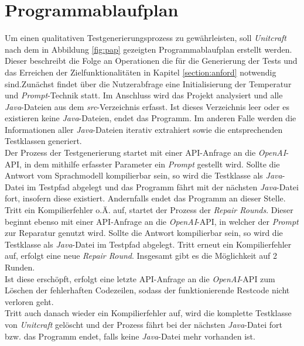 \section{Programmablaufplan}
Um einen qualitativen Testgenerierungsprozess zu gewährleisten, soll \textit{Unitcraft} nach dem in Abbildung \ref{fig:pap} gezeigten Programmablaufplan erstellt werden. Dieser beschreibt die Folge an Operationen die für die Generierung der Tests und das Erreichen der Zielfunktionalitäten in Kapitel \ref{section:anford} notwendig sind.Zunächst findet über die Nutzerabfrage eine Initialisierung der Temperatur und \textit{Prompt}-Technik statt. Im Anschluss wird das Projekt analysiert und alle \textit{Java}-Dateien aus dem \textit{src}-Verzeichnis erfasst. Ist dieses Verzeichnis leer oder es existieren keine \textit{Java}-Dateien, endet das Programm. Im anderen Falle werden die Informationen aller \textit{Java}-Dateien iterativ extrahiert sowie die entsprechenden Testklassen generiert.\\Der Prozess der Testgenerierung startet mit einer API-Anfrage an die \textit{OpenAI}-API, in dem mithilfe erfasster Parameter ein \textit{Prompt} gestellt wird. Sollte die Antwort vom Sprachmodell kompilierbar sein, so wird die Testklasse als \textit{Java}-Datei im Testpfad abgelegt und das Programm fährt mit der nächsten \textit{Java}-Datei fort, insofern diese existiert. Andernfalls endet das Programm an dieser Stelle.\\Tritt ein Kompilierfehler o.Ä. auf, startet der Prozess der \textit{Repair Rounds}. Dieser beginnt ebenso mit einer API-Anfrage an die \textit{OpenAI}-API, in welcher der \textit{Prompt} zur Reparatur genutzt wird. Sollte die Antwort kompilierbar sein, so wird die Testklasse als \textit{Java}-Datei im Testpfad abgelegt. Tritt erneut ein Kompilierfehler auf, erfolgt eine neue \textit{Repair Round}. Insgesamt gibt es die Möglichkeit auf 2 Runden.\\Ist diese erschöpft, erfolgt eine letzte API-Anfrage an die \textit{OpenAI}-API zum Löschen der fehlerhaften Codezeilen, sodass der funktionierende Restcode nicht verloren geht.\\Tritt auch danach wieder ein Kompilierfehler auf, wird die komplette Testklasse von \textit{Unitcraft} gelöscht und der Prozess fährt bei der nächsten \textit{Java}-Datei fort bzw. das Programm endet, falls keine \textit{Java}-Datei mehr vorhanden ist.